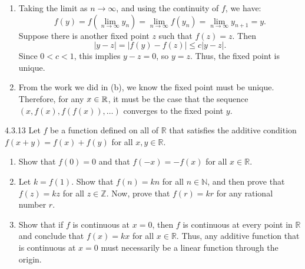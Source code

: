 {\begin{enumerate}
{            %
        }
        \newpage
        \item Taking the limit as \(n \to \infty\), and using the continuity of \(f\), we have:
        \[
            f(y) = f\left( \lim_{n \to \infty} y_n \right) = \lim_{n \to \infty} f(y_n) = \lim_{n \to \infty} y_{n+1} = y.
        \]
        Suppose there is another fixed point \(z\) such that \(f(z) = z\). Then
        \[
            |y - z| = |f(y) - f(z)| \leq c|y - z|.
        \]
        Since \(0 < c < 1\), this implies \(y - z = 0\), so \(y = z\). Thus, the fixed point is unique.
        \item From the work we did in (b), we know the fixed point must be unique. Therefore, for any \(x \in \mathbb{R}\), it must be the case that the sequence \((x, f(x), f(f(x)), \ldots)\) converges to the fixed point \(y\).
    \end{enumerate}
}
    
\begin{exercise}
    {4.3.13} Let \(f\) be a function defined on all of \(\mathbb{R}\) that satisfies the additive condition \(f(x + y) = f(x) + f(y)\) for all \(x, y \in \mathbb{R}\).
    \begin{enumerate}
        \item Show that \(f(0) = 0\) and that \(f(-x) = -f(x)\) for all \(x \in \mathbb{R}\).
        \item Let \(k = f(1)\). Show that \(f(n) = kn\) for all \(n \in \mathbb{N}\), and then prove that \(f(z) = kz\) for all \(z \in \mathbb{Z}\). Now, prove that \(f(r) = kr\) for any rational number \(r\).
        \item Show that if \(f\) is continuous at \(x = 0\), then \(f\) is continuous at every point in \(\mathbb{R}\) and conclude that \(f(x) = kx\) for all \(x \in \mathbb{R}\). Thus, any additive function that is continuous at \(x = 0\) must necessarily be a linear function through the origin.
    \end{enumerate}
\end{exercise}

